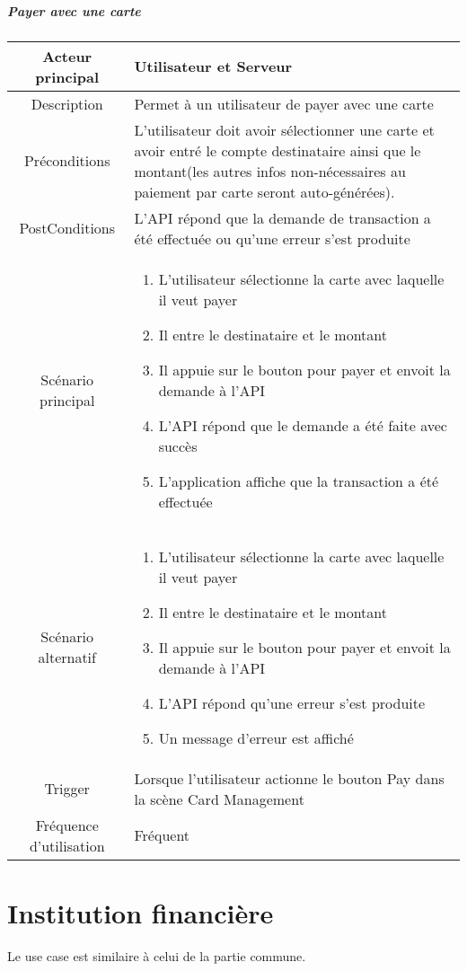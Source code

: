 \documentclass{article}
\begin{document}
\subparagraph{Payer avec une carte}
    \begin{table}[h]
        \begin{tabular}{|c|p{10cm}|}
        \hline
        Acteur principal& Utilisateur et Serveur    \\
        \hline
        Description&  Permet à un utilisateur de payer avec une carte  \\
        \hline
        Préconditions&   L'utilisateur doit avoir sélectionner une carte et avoir entré
             le compte destinataire ainsi que le montant(les autres infos non-nécessaires
             au paiement par carte seront auto-générées). \\
        \hline
        PostConditions&  L'API répond que la demande de transaction a été effectuée ou qu'une erreur s'est produite    \\
        \hline
        Scénario principal& 
                \begin{enumerate}
                    \item L'utilisateur sélectionne la carte avec laquelle il veut payer
                    \item Il entre le destinataire et le montant
                    \item Il appuie sur le bouton pour payer et envoit la demande à l'API
                    \item L'API répond que le demande a été faite avec succès
                    \item L'application affiche que la transaction a été effectuée
                \end{enumerate}     \\
        \hline
        Scénario alternatif&  
        \begin{enumerate}
            \item L'utilisateur sélectionne la carte avec laquelle il veut payer
            \item Il entre le destinataire et le montant
            \item Il appuie sur le bouton pour payer et envoit la demande à l'API
            \item L'API répond qu'une erreur s'est produite
            \item Un message d'erreur est affiché
        \end{enumerate}    \\
        \hline
        Trigger&   Lorsque l'utilisateur actionne le bouton Pay dans la scène Card Management   \\
        \hline
        Fréquence d'utilisation&   Fréquent  \\
        \hline
        \end{tabular}
    \end{table}

\newpage

\section{Institution financière}
Le use case est similaire à celui de la partie commune.
\end{document}
